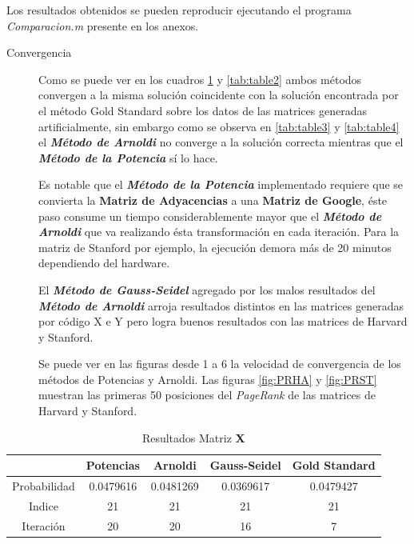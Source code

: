 \documentclass{article}
\begin{document}
Los resultados obtenidos se pueden reproducir ejecutando el programa \textit{Comparacion.m} presente en los anexos.

\begin{description}
\item[Convergencia] Como se puede ver en los cuadros \ref{tab:table1} y \ref{tab:table2} ambos métodos convergen a la misma solución  coincidente con la solución encontrada por el método Gold Standard sobre los datos de las matrices generadas artificialmente, sin embargo  como se observa en \ref{tab:table3} y \ref{tab:table4} el\textbf{\textit{ Método de Arnoldi}} no converge a la solución correcta mientras que el \textbf{\textit{Método de la Potencia}} sí lo hace. 

Es notable que el \textbf{\textit{Método de la Potencia}} implementado requiere que se convierta la \textbf{Matriz de Adyacencias }a una\textbf{ Matriz de Google}, éste paso consume un tiempo considerablemente mayor que el \textbf{\textit{Método de Arnoldi}} que va realizando ésta transformación en cada iteración. Para la matriz de Stanford por ejemplo, la ejecución demora más de 20 minutos dependiendo del hardware.

El\textbf{\textit{ Método de Gauss-Seidel}} agregado por los malos resultados del \textbf{\textit{Método de Arnoldi }}arroja resultados distintos en las matrices generadas por código X e Y pero logra buenos resultados con las matrices de Harvard y Stanford.

Se puede ver en las figuras  desde 1 a 6 la velocidad de convergencia de los métodos de Potencias y Arnoldi. 
Las figuras \ref{fig:PRHA} y \ref{fig:PRST} muestran las primeras 50 posiciones del \textit{PageRank} de las matrices de Harvard y Stanford.
 
 \end{description}

\begin{table}[ht!]
  \begin{center}
    \caption{Resultados Matriz \textbf{X}}
    \label{tab:table1}
    \begin{tabular}{ccccc}
      \toprule
       & Potencias & Arnoldi & Gauss-Seidel &Gold Standard\\
      \midrule
      Probabilidad &0.0479616  &  0.0481269  &0.0369617 &0.0479427\\
      Indice &21 & 21 &21 &21\\
      Iteración & 20 & 20 & 16& 7 \\
      \bottomrule
    \end{tabular}
  \end{center}
\end{table}
\end{document}
